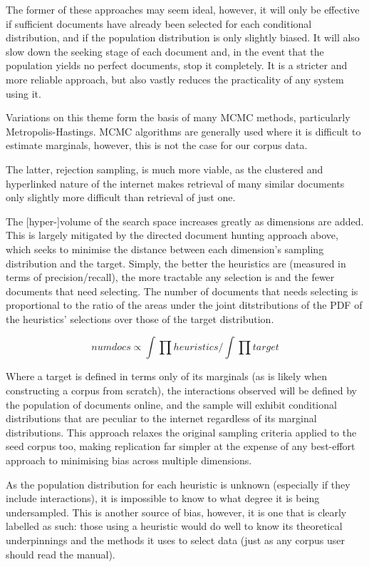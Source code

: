 The former of these approaches may seem ideal, however, it will only be effective if sufficient documents have already been selected for each conditional distribution, and if the population distribution is only slightly biased.  It will also slow down the seeking stage of each document and, in the event that the population yields no perfect documents, stop it completely.  It is a stricter and more reliable approach, but also vastly reduces the practicality of any system using it.

Variations on this theme form the basis of many MCMC methods, particularly Metropolis-Hastings.  MCMC algorithms are generally used where it is difficult to estimate marginals, however, this is not the case for our corpus data.


The latter, rejection sampling, is much more viable, as the clustered and hyperlinked nature of the internet makes retrieval of many similar documents only slightly more difficult than retrieval of just one.

The [hyper-]volume of the search space increases greatly as dimensions are added.  This is largely mitigated by the directed document hunting approach above, which seeks to minimise the distance between each dimension's sampling distribution and the target.  Simply, the better the heuristics are (measured in terms of precision/recall), the more tractable any selection is and the fewer documents that need selecting.  The number of documents that needs selecting is proportional to the ratio of the areas under the joint ditstributions of the PDF of the heuristics' selections over those of the target distribution.

$$
numdocs \propto \int{\prod{heuristics}} / \int{\prod{target}}
$$

Where a target is defined in terms only of its marginals (as is likely when constructing a corpus from scratch), the interactions observed will be defined by the population of documents online, and the sample will exhibit conditional distributions that are peculiar to the internet regardless of its marginal distributions.  This approach relaxes the original sampling criteria applied to the seed corpus too, making replication far simpler at the expense of any best-effort approach to minimising bias across multiple dimensions.

As the population distribution for each heuristic is unknown (especially if they include interactions), it is impossible to know to what degree it is being undersampled.  This is another source of bias, however, it is one that is clearly labelled as such: those using a heuristic would do well to know its theoretical underpinnings and the methods it uses to select data (just as any corpus user should read the manual).

